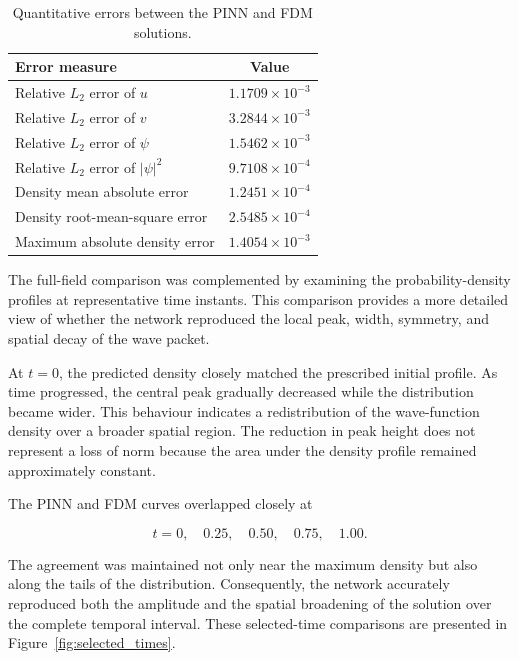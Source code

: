 \documentclass[11pt]{article}
\begin{document}
\begin{table}[htbp]
\centering
\caption{Quantitative errors between the PINN and FDM solutions.}
\label{tab:accuracy_metrics}
\begin{tabular}{lc}
\hline
\textbf{Error measure} & \textbf{Value} \\
\hline
Relative \(L_2\) error of \(u\)
& \(1.1709\times10^{-3}\) \\

Relative \(L_2\) error of \(v\)
& \(3.2844\times10^{-3}\) \\

Relative \(L_2\) error of \(\psi\)
& \(1.5462\times10^{-3}\) \\

Relative \(L_2\) error of \(|\psi|^2\)
& \(9.7108\times10^{-4}\) \\

Density mean absolute error
& \(1.2451\times10^{-4}\) \\

Density root-mean-square error
& \(2.5485\times10^{-4}\) \\

Maximum absolute density error
& \(1.4054\times10^{-3}\) \\
\hline
\end{tabular}

\end{table}


The full-field comparison was complemented by examining the probability-density profiles at representative time instants. This comparison provides a more detailed view of whether the network reproduced the local peak, width, symmetry, and spatial decay of the wave packet.

At \(t=0\), the predicted density closely matched the prescribed initial profile. As time progressed, the central peak gradually decreased while the distribution became wider. This behaviour indicates a redistribution of the wave-function density over a broader spatial region. The reduction in peak height does not represent a loss of norm because the area under the density profile remained approximately constant.

The PINN and FDM curves overlapped closely at

\[
t=0,\quad 0.25,\quad 0.50,\quad 0.75,\quad 1.00.
\]

The agreement was maintained not only near the maximum density but also along the tails of the distribution. Consequently, the network accurately reproduced both the amplitude and the spatial broadening of the solution over the complete temporal interval. These selected-time comparisons are presented in Figure~\ref{fig:selected_times}.
\end{document}
